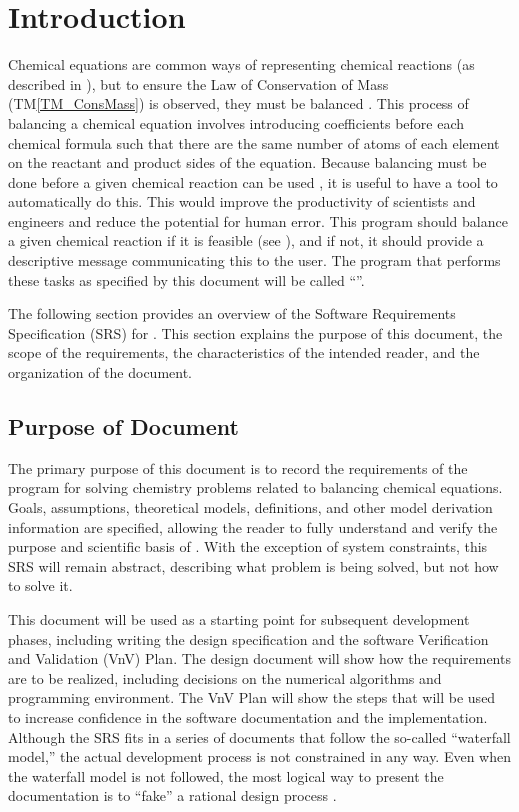 \documentclass[12pt]{article}
\newcommand{\tmref}[1]{TM\ref{#1}}
\begin{document}
\section{Introduction} \label{sec_intro}
Chemical equations are common ways of representing chemical reactions (as
described in ), but to ensure the Law of Conservation
of Mass (\tmref{TM_ConsMass}) is observed, they must be balanced
\cite{lund_introduction_2023}. This process of balancing a chemical
equation involves introducing coefficients before each chemical formula such
that there are the same number of atoms of each element on the reactant and
product sides of the equation. Because balancing must be done before a given
chemical reaction can be used \cite{lund_introduction_2023}, it is useful to
have a tool to automatically do this. This would improve the
productivity of scientists and engineers and reduce the potential for human
error. This program should balance a given chemical reaction if it is
feasible (see ), and if not, it should provide a
descriptive message communicating this to the user. The program that performs
these tasks as specified by this document will be called ``\progname{}''.

The following section provides an overview of the Software Requirements
Specification (SRS) for \progname{}. This section explains the purpose of this
document, the scope of the requirements, the characteristics of the intended
reader, and the organization of the document.

\subsection{Purpose of Document} \label{sec_purpose}

The primary purpose of this document is to record the requirements of the
program for solving chemistry problems related to balancing chemical equations.
Goals, assumptions, theoretical models,
definitions, and other model derivation information are specified, allowing the
reader to fully understand and verify the purpose and scientific basis of
\progname{}. With the exception of system constraints, this SRS will remain
abstract, describing what problem is being solved, but not how to solve it.

This document will be used as a starting point for subsequent development
phases, including writing the design specification and the software Verification
and Validation (VnV) Plan. The design document will show how the requirements
are to be realized, including decisions on the numerical algorithms and
programming environment. The VnV Plan will show the steps that will be used to
increase confidence in the software documentation and the implementation.
Although the SRS fits in a series of documents that follow the so-called
``waterfall model,'' the actual development process is not constrained in any
way. Even when the waterfall model is not followed, the most logical way to
present the documentation is to ``fake'' a rational design process
\cite{ParnasAndClements1986}.
\end{document}
